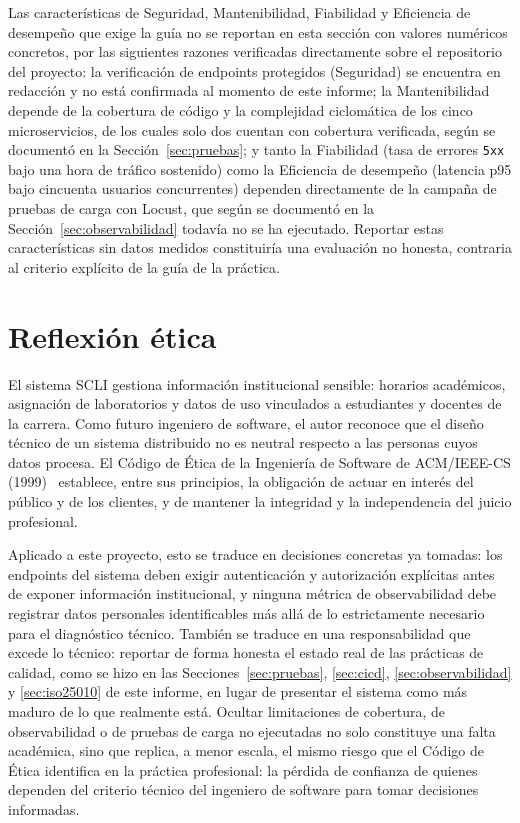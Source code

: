 \documentclass[11pt,a4paper]{article}
\begin{document}
Las características de Seguridad, Mantenibilidad, Fiabilidad y
Eficiencia de desempeño que exige la guía no se reportan en esta
sección con valores numéricos concretos, por las siguientes razones
verificadas directamente sobre el repositorio del proyecto: la
verificación de endpoints protegidos (Seguridad) se encuentra en
redacción y no está confirmada al momento de este informe; la
Mantenibilidad depende de la cobertura de código y la complejidad
ciclomática de los cinco microservicios, de los cuales solo dos
cuentan con cobertura verificada, según se documentó en la
Sección~\ref{sec:pruebas}; y tanto la Fiabilidad (tasa de errores
\texttt{5xx} bajo una hora de tráfico sostenido) como la Eficiencia de
desempeño (latencia p95 bajo cincuenta usuarios concurrentes) dependen
directamente de la campaña de pruebas de carga con Locust, que según
se documentó en la Sección~\ref{sec:observabilidad} todavía no se ha
ejecutado. Reportar estas características sin datos medidos
constituiría una evaluación no honesta, contraria al criterio
explícito de la guía de la práctica.

\section{Reflexión ética}
\label{sec:etica}

El sistema SCLI gestiona información institucional sensible: horarios
académicos, asignación de laboratorios y datos de uso vinculados a
estudiantes y docentes de la carrera. Como futuro ingeniero de
software, el autor reconoce que el diseño técnico de un sistema
distribuido no es neutral respecto a las personas cuyos datos
procesa. El Código de Ética de la Ingeniería de Software de ACM/IEEE-CS
(1999)~\cite{acm2018code} establece, entre sus principios, la
obligación de actuar en interés del público y de los clientes, y de
mantener la integridad y la independencia del juicio profesional.

Aplicado a este proyecto, esto se traduce en decisiones concretas ya
tomadas: los endpoints del sistema deben exigir autenticación y
autorización explícitas antes de exponer información institucional, y
ninguna métrica de observabilidad debe registrar datos personales
identificables más allá de lo estrictamente necesario para el
diagnóstico técnico. También se traduce en una responsabilidad que
excede lo técnico: reportar de forma honesta el estado real de las
prácticas de calidad, como se hizo en las Secciones~\ref{sec:pruebas},
\ref{sec:cicd}, \ref{sec:observabilidad} y \ref{sec:iso25010} de este
informe, en lugar de presentar el sistema como más maduro de lo que
realmente está. Ocultar limitaciones de cobertura, de observabilidad o
de pruebas de carga no ejecutadas no solo constituye una falta
académica, sino que replica, a menor escala, el mismo riesgo que el
Código de Ética identifica en la práctica profesional: la pérdida de
confianza de quienes dependen del criterio técnico del ingeniero de
software para tomar decisiones informadas.
\end{document}
